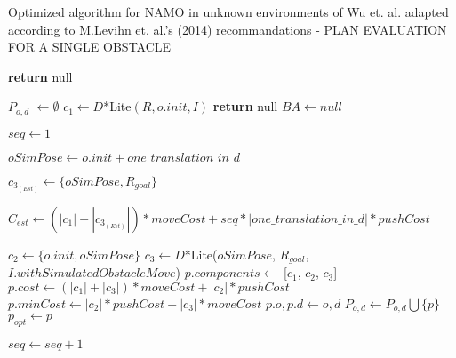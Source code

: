 \begin{algorithm}[H]

  \caption{Optimized algorithm for NAMO in unknown environments of Wu et. al. adapted according to M.Levihn et. al.'s (2014) recommandations - PLAN EVALUATION FOR A SINGLE OBSTACLE}

  \label{alg:02-levihn-planforobstacle}

  \begin{algorithmic}[1]


        \State \textbf{return} null
      \EndIf

      \State $P_{o,d}$ $\gets \emptyset$
      \State $c_{1} \gets D$*Lite$(R, o.init, I)$
        \State \textbf{return} null
      \EndIf
      \State $BA \gets null$ \label{lst:line:remember_ba_note_1}


        \State $seq \gets 1$

        \State $oSimPose \gets o.init + one\_translation\_in\_d$

        \State $c_{3_{(Est)}} \gets \{oSimPose, R_{goal}\}$ \label{lst:line:new_bound_1}

        \State $C_{est} \gets (|c_{1}| + |c_{3_{(Est)}}|) * moveCost + seq * |one\_translation\_in\_d| * pushCost$

         \label{lst:line:new_bound_2}

           \label{lst:line:remember_ba_note_2}
            \State $c_{2} \gets \{o.init, oSimPose\}$
            \State $c_{3} \gets D$*Lite($oSimPose$, $R_{goal}$, $I.withSimulatedObstacleMove$)
              \State $p.components \gets$ [$c_{1}$, $c_{2}$, $c_{3}$]
              \State $p.cost \gets (|c_{1}| + |c_{3}|) * moveCost + |c_{2}| * pushCost$
              \State $p.minCost \gets |c_{2}| * pushCost + |c_{3}| * moveCost$
              \State $p.o, p.d \gets o, d$
              \State $P_{o,d} \gets P_{o,d} \bigcup \{p\}$
                \State $p_{opt} \gets p$
              \EndIf
            \EndIf
          \EndIf

          \State $seq \gets seq + 1$


\end{algorithmic}
\end{algorithm}

